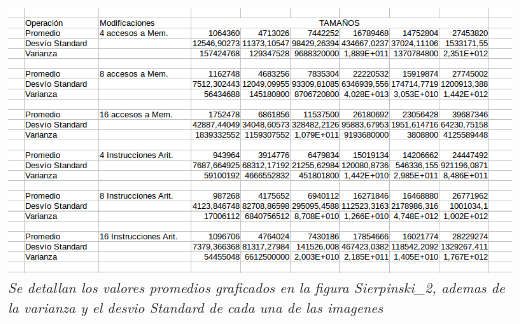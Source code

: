 \documentclass[a4paper]{article}
\begin{document}
\includegraphics[width=\textwidth,height=\textheight,keepaspectratio
]{modifi.jpg}\textit{Se detallan los valores promedios graficados en la figura Sierpinski\_2, ademas de la varianza y el desvio Standard de cada una de las imagenes}\newline \newline
\end{document}
